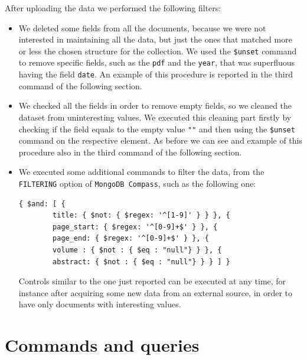 After uploading the data we performed the following filters:
\begin{itemize}
    \item We deleted some fields from all the documents, because we were not interested in maintaining all the data, but just the ones that matched more or less the chosen structure for the collection.
    We used the \verb|$unset| command to remove specific fields, such as the \verb|pdf| and the \verb|year|, that was superfluous having the field \verb|date|.
    An example of this procedure is reported in the third command of the following section.
    \item We checked all the fields in order to remove empty fields, so we cleaned the dataset from uninteresting values.
    We executed this cleaning part firstly by checking if the field equals to the empty value \verb|""| and then using the \verb|$unset| command on the respective element.
    As before we can see and example of this procedure also in the third command of the following section.
    \item We executed some additional commands to filter the data, from the \verb|FILTERING| option of \verb|MongoDB Compass|, such as the following one:
    \begin{lstlisting}[label={lst:lstlisting54}]
{ $and: [ {
        title: { $not: { $regex: '^[1-9]' } } }, {
        page_start: { $regex: '^[0-9]+$' } }, {
        page_end: { $regex: '^[0-9]+$' } }, {
        volume : { $not : { $eq : "null"} } }, {
        abstract: { $not : { $eq : "null"} } } ] }
    \end{lstlisting}
    Controls similar to the one just reported can be executed at any time, for instance after acquiring some new data from an external source, in order to have only documents with interesting values.
\end{itemize}


\chapter{Commands and queries}
\label{ch:commands_and_queries_mongodb}%



